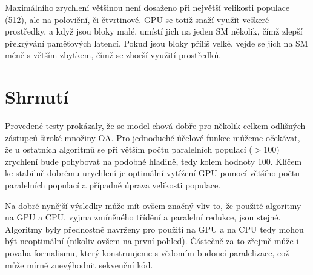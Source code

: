 Maximálního zrychlení většinou není dosaženo při největší velikosti populace (512), ale na poloviční, či čtvrtinové. GPU se totiž snaží využít veškeré prostředky, a když jsou bloky malé, umístí jich na jeden SM několik, čímž zlepší překrývání paměťových latencí. Pokud jsou bloky příliš velké, vejde se jich na SM méně s větším \bq zbytkem\eq , čímž se zhorší využití prostředků.

\section{Shrnutí}

Provedené testy prokázaly, že se model chová dobře pro několik celkem odlišných zástupců široké množiny OA. Pro jednoduché účelové funkce můžeme očekávat, že u ostatních algoritmů se při větším počtu paralelních populací ($>100$) zrychlení bude pohybovat na podobné hladině, tedy kolem hodnoty 100. Klíčem ke stabilně dobrému urychlení je optimální vytížení GPU pomocí většího počtu paralelních populací a případně úprava velikosti populace.

Na dobré nynější výsledky může mít ovšem značný vliv to, že použité algoritmy na GPU a CPU, vyjma zmíněného třídění a paralelní redukce, jsou stejné. Algoritmy byly přednostně navrženy pro použití na GPU a na CPU tedy mohou být neoptimální (nikoliv ovšem na první pohled). Částečně za to zřejmě může i povaha formalismu, který konstruujeme s vědomím budoucí paralelizace, což může mírně znevýhodnit sekvenční kód.

